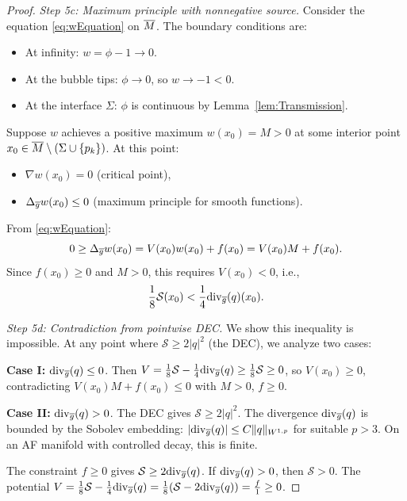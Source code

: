 \begin{proof}
\textit{Step 5c: Maximum principle with nonnegative source.}
Consider the equation \eqref{eq:wEquation} on $\overline{M}$. The boundary conditions are:
\begin{itemize}
    \item At infinity: $w = \phi - 1 \to 0$.
    \item At the bubble tips: $\phi \to 0$, so $w \to -1 < 0$.
    \item At the interface $\Sigma$: $\phi$ is continuous by Lemma~\ref{lem:Transmission}.
\end{itemize}

Suppose $w$ achieves a positive maximum $w(x_0) = M > 0$ at some interior point $x_0 \in \overline{M} \setminus (\Sigma \cup \{p_k\})$. At this point:
\begin{itemize}
    \item $\nabla w(x_0) = 0$ (critical point),
    \item $\Delta_{\overline{g}} w(x_0) \le 0$ (maximum principle for smooth functions).
\end{itemize}
From \eqref{eq:wEquation}:
\begin{equation}
    0 \ge \Delta_{\overline{g}} w(x_0) = V(x_0) w(x_0) + f(x_0) = V(x_0) M + f(x_0).
\end{equation}
Since $f(x_0) \ge 0$ and $M > 0$, this requires $V(x_0) < 0$, i.e.,
\begin{equation}
    \frac{1}{8}\mathcal{S}(x_0) < \frac{1}{4}\mathrm{div}_{\overline{g}}(q)(x_0).
\end{equation}

\textit{Step 5d: Contradiction from pointwise DEC.}
We show this inequality is impossible. At any point where $\mathcal{S} \ge 2|q|^2$ (the DEC), we analyze two cases:

\textbf{Case I:} $\mathrm{div}_{\overline{g}}(q) \le 0$. Then $V = \frac{1}{8}\mathcal{S} - \frac{1}{4}\mathrm{div}_{\overline{g}}(q) \ge \frac{1}{8}\mathcal{S} \ge 0$, so $V(x_0) \ge 0$, contradicting $V(x_0) M + f(x_0) \le 0$ with $M > 0$, $f \ge 0$.

\textbf{Case II:} $\mathrm{div}_{\overline{g}}(q) > 0$. The DEC gives $\mathcal{S} \ge 2|q|^2$. The divergence $\mathrm{div}_{\overline{g}}(q)$ is bounded by the Sobolev embedding: $|\mathrm{div}_{\overline{g}}(q)| \le C \|q\|_{W^{1,p}}$ for suitable $p > 3$. On an AF manifold with controlled decay, this is finite.

The constraint $f \ge 0$ gives $\mathcal{S} \ge 2\mathrm{div}_{\overline{g}}(q)$. If $\mathrm{div}_{\overline{g}}(q) > 0$, then $\mathcal{S} > 0$. The potential $V = \frac{1}{8}\mathcal{S} - \frac{1}{4}\mathrm{div}_{\overline{g}}(q) = \frac{1}{8}(\mathcal{S} - 2\mathrm{div}_{\overline{g}}(q)) = \frac{f}{1} \ge 0$.


\end{proof}
